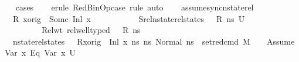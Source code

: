 \begin{isabellebody}
\ \ \isamarkupfalse%
\ {\isacharparenleft}{\kern0pt}cases{\isacharparenright}{\kern0pt}\isanewline
\ \ \isamarkupfalse%
\ {\isacharparenleft}{\kern0pt}erule\ RedBinOp{\isacharunderscore}{\kern0pt}case{\isacharcomma}{\kern0pt}\ rule{\isacharcomma}{\kern0pt}\ auto{\isacharparenright}{\kern0pt}\isanewline
\ \ \isamarkupfalse%
\isanewline
{}\isamarkupfalse%
%
\endisatagproof
{\isafoldproof}%
%
\isadelimproof
\isanewline
%
\endisadelimproof
\isanewline
{}\isamarkupfalse%
\ assume{\isacharunderscore}{\kern0pt}sync{\isacharunderscore}{\kern0pt}nstate{\isacharunderscore}{\kern0pt}rel{\isacharcolon}{\kern0pt}\isanewline
\ \ \ {\isachardoublequoteopen}R\ x{\isacharunderscore}{\kern0pt}orig\ {\isacharequal}{\kern0pt}\ Some\ {\isacharparenleft}{\kern0pt}Inl\ x{}{\isacharparenright}{\kern0pt}{\isachardoublequoteclose}\ \isanewline
\ \ \ \ \ \ \ \ \ \ Srel{\isacharcolon}{\kern0pt}{\isachardoublequoteopen}nstate{\isacharunderscore}{\kern0pt}rel{\isacharunderscore}{\kern0pt}states\ {\isasymLambda}\ {\isasymLambda}{\isacharprime}{\kern0pt}\ R\ ns\ U{\isachardoublequoteclose}\ \ \isanewline
\ \ \ \ \ \ \ \ \ \ Rel{\isacharunderscore}{\kern0pt}wt{\isacharcolon}{\kern0pt}\ {\isachardoublequoteopen}rel{\isacharunderscore}{\kern0pt}well{\isacharunderscore}{\kern0pt}typed\ {\isasymLambda}\ {\isasymOmega}\ R\ ns{\isachardoublequoteclose}\isanewline
\ \ \ {\isachardoublequoteopen}nstate{\isacharunderscore}{\kern0pt}rel{\isacharunderscore}{\kern0pt}states\ {\isasymLambda}\ {\isasymLambda}{\isacharprime}{\kern0pt}\ {\isacharparenleft}{\kern0pt}R{\isacharparenleft}{\kern0pt}x{\isacharunderscore}{\kern0pt}orig\ {\isasymmapsto}\ {\isacharparenleft}{\kern0pt}Inl\ x{}{\isacharparenright}{\kern0pt}{\isacharparenright}{\kern0pt}{\isacharparenright}{\kern0pt}\ ns\ {\isacharbraceleft}{\kern0pt}ns{\isacharprime}{\kern0pt}{\isachardot}{\kern0pt}\ Normal\ ns{\isacharprime}{\kern0pt}\ {\isasymin}\ {\isacharparenleft}{\kern0pt}set{\isacharunderscore}{\kern0pt}red{\isacharunderscore}{\kern0pt}cmd\ M\ {\isasymLambda}{\isacharprime}{\kern0pt}\ {\isasymGamma}\ {\isasymOmega}\ {\isacharparenleft}{\kern0pt}Assume\ {\isacharparenleft}{\kern0pt}{\isacharparenleft}{\kern0pt}Var\ x{}{\isacharparenright}{\kern0pt}\ {\isasymguillemotleft}Eq{\isasymguillemotright}\ {\isacharparenleft}{\kern0pt}Var\ x{}{\isacharparenright}{\kern0pt}{\isacharparenright}{\kern0pt}{\isacharparenright}{\kern0pt}\ U{\isacharparenright}{\kern0pt}{\isacharbraceright}{\kern0pt}{\isachardoublequoteclose}\isanewline

\end{isabellebody}
